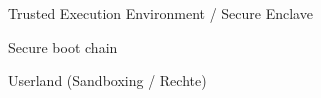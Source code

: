 \begin{frame}

\begin{block}{}
	Trusted Execution Environment / Secure Enclave
\end{block}
\begin{block}{}
	Secure boot chain
\end{block}
\begin{block}{}
	Userland (Sandboxing / Rechte)
\end{block}

\end{frame}